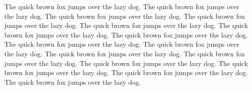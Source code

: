 \documentclass{refcard}
\begin{document}
The quick brown fox jumps over the lazy dog.
The quick brown fox jumps over the lazy dog.
The quick brown fox jumps over the lazy dog.
The quick brown fox jumps over the lazy dog.
The quick brown fox jumps over the lazy dog.
The quick brown fox jumps over the lazy dog.
The quick brown fox jumps over the lazy dog.
The quick brown fox jumps over the lazy dog.
The quick brown fox jumps over the lazy dog.
The quick brown fox jumps over the lazy dog.
The quick brown fox jumps over the lazy dog.
The quick brown fox jumps over the lazy dog.
The quick brown fox jumps over the lazy dog.
The quick brown fox jumps over the lazy dog.
The quick brown fox jumps over the lazy dog.
\end{document}
